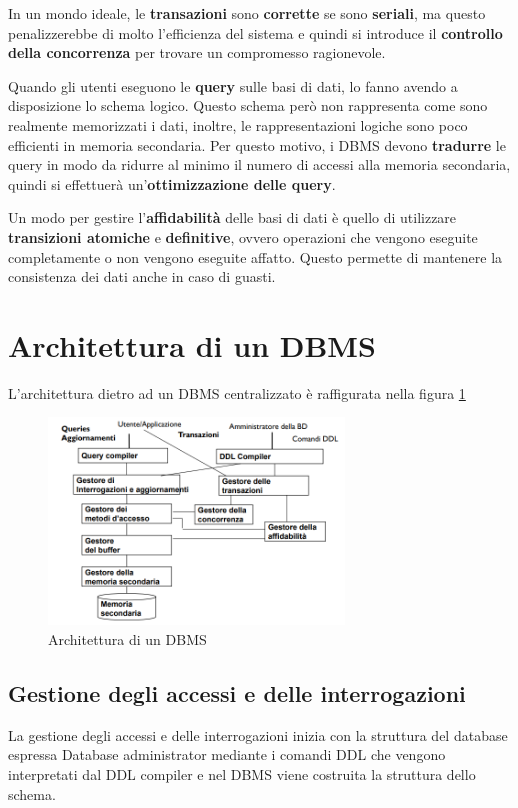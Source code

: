 In un mondo ideale, le \textbf{transazioni} sono \textbf{corrette} se sono
\textbf{seriali}, ma questo penalizzerebbe di molto l'efficienza del sistema e
quindi si introduce il \textbf{controllo della concorrenza} per trovare un
compromesso ragionevole.

Quando gli utenti eseguono le \textbf{query} sulle basi di dati, lo fanno avendo
a disposizione lo schema logico. Questo schema però non rappresenta come sono
realmente memorizzati i dati, inoltre, le rappresentazioni logiche sono poco
efficienti in memoria secondaria. Per questo motivo, i DBMS devono
\textbf{tradurre} le query in modo da ridurre al minimo il numero di accessi
alla memoria secondaria, quindi si effettuerà un'\textbf{ottimizzazione delle query}.

Un modo per gestire l'\textbf{affidabilità} delle basi di dati è quello di utilizzare
\textbf{transizioni atomiche} e \textbf{definitive}, ovvero operazioni che
vengono eseguite completamente o non vengono eseguite affatto. Questo permette
di mantenere la consistenza dei dati anche in caso di guasti.
\section{Architettura di un DBMS}
L'architettura dietro ad un DBMS centralizzato è raffigurata nella figura \ref{fig:DBMS_architecture}
\begin{figure}[!ht]
      \centering
      \includegraphics[width=0.7\textwidth]{./img/DBMS/Architettura.png}
      \caption{Architettura di un DBMS}
      \label{fig:DBMS_architecture}
\end{figure}
\subsection{Gestione degli accessi e delle interrogazioni}
La gestione degli accessi e delle interrogazioni inizia con la struttura del database
espressa Database administrator mediante i comandi DDL che vengono interpretati
dal DDL compiler e nel DBMS viene costruita la struttura dello schema.

